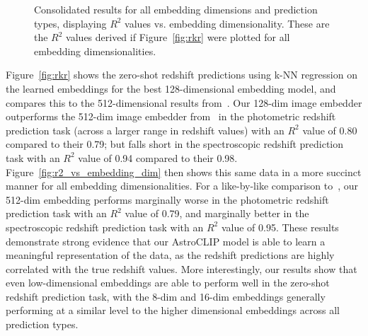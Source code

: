 \begin{figure}[t]
    \centering
    \caption{Consolidated results for all embedding dimensions and prediction types, displaying $R^{2}$ values vs. embedding dimensionality.
    These are the $R^{2}$ values derived if Figure~\eqref{fig:rkr} were plotted for all embedding dimensionalities.}
    \label{fig:r2_vs_embedding_dim}
\end{figure}

Figure~\eqref{fig:rkr} shows the zero-shot redshift predictions using k-NN regression on the learned embeddings for
the best 128-dimensional embedding model, and compares this to the 512-dimensional results from~\cite{astroclip}.
Our 128-dim image embedder outperforms the 512-dim image embedder from~\cite{astroclip} in the photometric redshift
prediction task (across a larger range in redshift values) with an $R^{2}$ value of 0.80 compared to their 0.79;
but falls short in the spectroscopic redshift prediction task with an $R^{2}$ value of 0.94 compared to their 0.98.
Figure~\eqref{fig:r2_vs_embedding_dim} then shows this same data in a more succinct manner for all embedding dimensionalities.
For a like-by-like comparison to~\cite{astroclip}, our 512-dim embedding performs marginally worse in the photometric redshift prediction
task with an $R^{2}$ value of 0.79, and marginally better in the spectroscopic redshift prediction task with an $R^{2}$ value
of 0.95.
These results demonstrate strong evidence that our AstroCLIP model is able to learn a meaningful representation of the
data, as the redshift predictions are highly correlated with the true redshift values.
More interestingly, our results show that even low-dimensional embeddings are able to perform well in the zero-shot
redshift prediction task, with the 8-dim and 16-dim embeddings generally performing at a similar level to the higher
dimensional embeddings across all prediction types.

